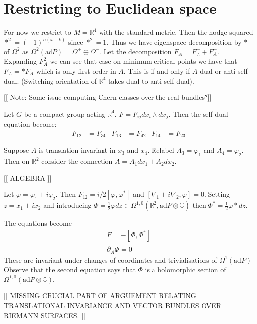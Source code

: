 
\section{Restricting to Euclidean space} %


For now we restrict to $ M = \mathbb{R}  ^4 $ with the standard metric. 
Then the hodge squared $ * ^2 = ( -1) ^{n(n-k) } $ since $ * ^2 = 1$. 
Thus we have eigenspace decomposition by $*$ of $\Omega^2 $ as $\Omega^2(\mathrm{ad}P) = \Omega^+ \oplus \Omega^- $. 
Let the decomposition $ F_A = F_A ^+ + F_A ^- $.
Expanding $F_A ^2 $ we can see that case on minimum critical points we have that $ F_A = * F_A$
which is only first order in $A$. 
This is if and only if $A$ dual or anti-self dual.
(Switching orientation of $\mathbb{R} ^4$ takes dual to anti-self-dual). 

[[ Note: Some issue computing Chern classes over the real bundles?]]



Let $G$ be a compact group acting $ \mathbb{R} ^4$. 
$ F = F_{ij} dx_i \wedge dx_j $.
Then the self dual equation become:
\begin{align}
    F_{12} &= F_{34}  & F_{13} &= F_{42}  & F_{14} &= F_{23}  
\end{align}

Suppose $ A $ is translation invariant in $x_3$ and $x_4$.
Relabel $ A_3 = \varphi_1 $ and $A_4 = \varphi_2$.
Then on $ \mathbb{R} ^2 $ consider the connection $ A = A_1 dx_1 + A_2 dx_2 $. 

[[ ALGEBRA ]] 

Let $\varphi = \varphi_1 + i \varphi_2$. 
Then $ F_{12} = i/2 [ \varphi , \varphi ^* ] $ and $[ \nabla_1 + i \nabla_2 , \varphi ] = 0 $. 
Setting $ z = x_1 + ix_2$ and introducing $ \Phi = \frac{1}{2} \varphi dz \in \Omega^{1,0} ( \mathbb{R} ^2 , \mathrm{ad}P \otimes \mathbb{C} )$
then $\Phi^* = \frac{1}{2} \varphi * d\bar{z}$. 

The equations become 
\begin{align}
    F = - [ \Phi , \Phi^* ] \\
    \bar{\partial} _A \Phi = 0 
\end{align}
These are invariant under changes of coordinates and trivialisations of $ \Omega^1(\mathrm{ad} P ) $
Observe that the second equation says that $\Phi $ is a holomorphic section of $ \Omega^{1,0} ( \mathrm{ad} P \otimes \mathbb{C}) $.


[[ MISSING CRUCIAL PART OF ARGUEMENT RELATING TRANSLATIONAL INVARIANCE AND VECTOR BUNDLES OVER RIEMANN SURFACES. ]] 


